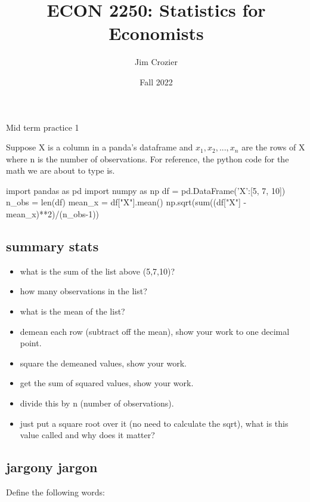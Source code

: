 \documentclass[11pt]{article}
\title{ECON 2250: Statistics for Economists}
\author{Jim Crozier}
\date{Fall 2022}
\newcommand{\blankline}{\quad\pagebreak[2]}
\begin{document}
\maketitle

\blankline

Mid term practice 1

\vspace{10 mm}

Suppose X is a column in a panda's dataframe and $x_1, x_2, ..., x_n$ are the rows of X where n is the number of observations. For reference, the python code for the math we are about to type is.

\begin{python}
import pandas as pd
import numpy as np
df = pd.DataFrame({'X':[5, 7, 10]})
n_obs = len(df)
mean_x = df["X"].mean()
np.sqrt(sum((df["X"] - mean_x)**2)/(n_obs-1))
\end{python}

\subsection{summary stats}
\begin{itemize}
\item what is the sum of the list above (5,7,10)?
\item how many observations in the list?
\item what is the mean of the list?
\item demean each row (subtract off the mean), show your work to one decimal point. 
\item square the demeaned values, show your work. 
\item get the sum of squared values, show your work. 
\item divide this by n (number of observations). 
\item just put a square root over it (no need to calculate the sqrt), what is this value called and why does it matter? 
\end{itemize}
\subsection{jargony jargon}
Define the following words:
\end{document}
